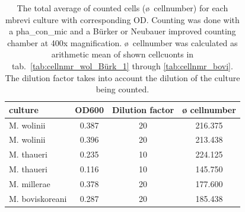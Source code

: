\begin{table}[ht]
\centering
\caption[The total average of counted cells (ø~cellnumber) for each \acrfull{mbrevi} culture with corresponding \acrshort{OD}.]{The total average of counted cells (ø~cellnumber) for each \acrfull{mbrevi} culture with corresponding \acrshort{OD}. Counting was done with a \gls{pha_con_mic} and a Bürker or Neubauer improved counting chamber at 400x magnification. ø~cellnumber was calculated as arithmetic mean of shown cellcuonts in tab.~\ref{tab:cellnmr_wol_Bürk_1} through \ref{tab:cellnmr_bovi}. The dilution factor takes into account the dilution of the culture being counted.} 
\label{tab:ø_cell_per_culture}
\begin{tabular}{lccc}
  \toprule
culture & OD600 & Dilution factor & ø cellnumber \\ 
  \midrule
M. wolinii & 0.387 & 20 & 216.375 \\ 
  M. wolinii & 0.396 & 20 & 213.438 \\ 
  M. thaueri & 0.235 & 10 & 224.125 \\ 
  M. thaueri & 0.116 & 10 & 145.750 \\ 
  M. millerae & 0.378 & 20 & 177.600 \\ 
  M. boviskoreani & 0.287 & 20 & 185.438 \\ 
   \bottomrule
\end{tabular}
\end{table}
